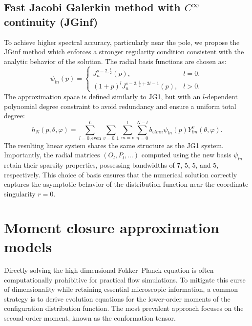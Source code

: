\documentclass[preprint,12pt]{elsarticle}
\begin{document}
\subsection{Fast Jacobi Galerkin method with $C^{\infty}$ continuity (JGinf)}
To achieve higher spectral accuracy, particularly near the pole, we propose the JGinf method which enforces a stronger regularity condition consistent with the analytic behavior of the solution. The radial basis functions are chosen as:
\begin{equation}
    \psi_{ln}(p)=\begin{cases}
        J_n^{s-2,\frac{1}{2}}(p), & l=0, \\
        (1+p)^l J_n^{s-2,\frac{1}{2}+2l-1}(p), & l>0.
    \end{cases}
\end{equation}
The approximation space is defined similarly to JG1, but with an $l$-dependent polynomial degree constraint to avoid redundancy and ensure a uniform total degree:
\begin{equation}
    h_N(p,\theta,\varphi)=\sum_{l=0, \text{even}}^{L}\sum_{v=0,1}\sum_{m=v}^{l}\sum_{n=0}^{N-l} b_{vlmn}\psi_{ln}(p)Y_{lm}^v(\theta,\varphi).
\end{equation}
The resulting linear system shares the same structure as the JG1 system. Importantly, the radial matrices $(O_l, P_l, \dots)$ computed using the new basis $\psi_{ln}$ retain their sparsity properties, possessing bandwidths of 7, 5, 5, and 5, respectively. This choice of basis ensures that the numerical solution correctly captures the asymptotic behavior of the distribution function near the coordinate singularity $r=0$.

\section{Moment closure approximation models}

Directly solving the high-dimensional Fokker--Planck equation is often computationally prohibitive for practical flow simulations. To mitigate this curse of dimensionality while retaining essential microscopic information, a common strategy is to derive evolution equations for the lower-order moments of the configuration distribution function. The most prevalent approach focuses on the second-order moment, known as the conformation tensor.
\end{document}
